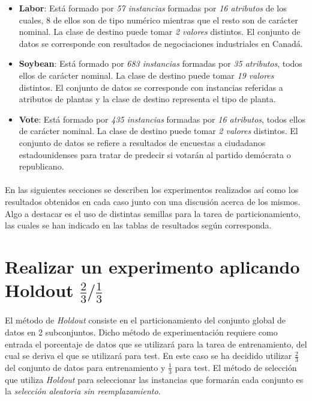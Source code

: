 \documentclass{article}
\begin{document}
			\begin{itemize}

				\item \textbf{Labor}\cite{dataset:labor}: Está formado por \emph{57 instancias} formadas por \emph{16 atributos} de los cuales, 8 de ellos son de tipo numérico mientras que el resto son de carácter nominal. La clase de destino puede tomar \emph{2 valores} distintos. El conjunto de datos se corresponde con resultados de negociaciones industriales en Canadá.

				\item \textbf{Soybean}\cite{dataset:soybean}: Está formado por \emph{683 instancias} formadas por \emph{35 atributos}, todos ellos de carácter nominal. La clase de destino puede tomar \emph{19 valores} distintos. El conjunto de datos se corresponde con instancias referidas a atributos de plantas y la clase de destino representa el tipo de planta.

				\item \textbf{Vote}\cite{dataset:vote}: Está formado por \emph{435 instancias} formadas por \emph{16 atributos}, todos ellos de carácter nominal. La clase de destino puede tomar \emph{2 valores} distintos. El conjunto de datos se refiere a resultados de encuestas a ciudadanos estadounidenses para tratar de predecir si votarán al partido demócrata o republicano.

			\end{itemize}

		\paragraph{}
		En las siguientes secciones se describen los experimentos realizados así como los resultados obtenidos en cada caso junto con una discusión acerca de los mismos. Algo a destacar es el uso de distintas semillas para la tarea de particionamiento, las cuales se han indicado en las tablas de resultados según corresponda.

	\section{Realizar un experimento aplicando Holdout $\tfrac{2}{3}/\tfrac{1}{3}$}
	\label{sec:e1}

		\paragraph{}
		El método de \emph{Holdout} consiste en el particionamiento del conjunto global de datos en 2 subconjuntos. Dicho método de experimentación requiere como entrada el porcentaje de datos que se utilizará para la tarea de entrenamiento, del cual se deriva el que se utilizará para test. En este caso se ha decidido utilizar $\tfrac{2}{3}$ del conjunto de datos para entrenamiento y $\tfrac{1}{3}$ para test. El método de selección que utiliza \emph{Holdout} para seleccionar las instancias que formarán cada conjunto es la \emph{selección aleatoria sin reemplazamiento}.
\end{document}

